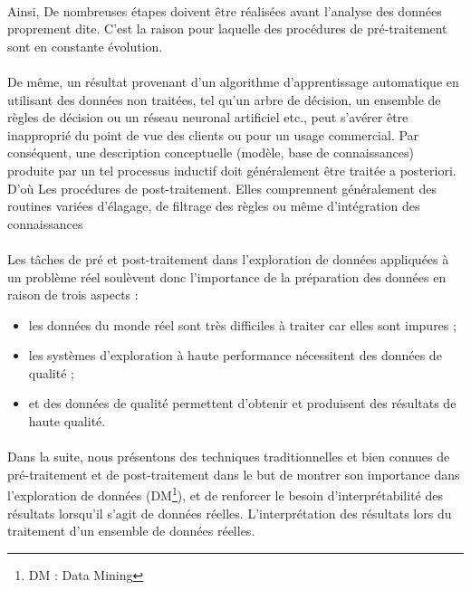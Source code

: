 \documentclass[a4paper, 12pt]{article}
\begin{document}
	\paragraph{}Ainsi, De nombreuses étapes doivent être réalisées avant l'analyse des données proprement dite. C'est la raison pour laquelle des procédures de pré-traitement sont en constante évolution.
	\paragraph{}De même, un résultat provenant d'un algorithme d'apprentissage automatique en utilisant des données non traitées, tel qu'un arbre de décision, un ensemble de règles de décision ou un réseau neuronal artificiel etc., peut s’avérer être inapproprié du point de vue des clients ou pour un usage commercial. Par conséquent, une description conceptuelle (modèle, base de connaissances) produite par  un tel processus inductif doit généralement être traitée a posteriori. D’où Les procédures de post-traitement. Elles comprennent généralement des routines variées d'élagage, de filtrage des règles ou même d'intégration des connaissances
	\paragraph{}Les tâches de pré et post-traitement dans l'exploration de données appliquées à un problème réel  soulèvent donc l'importance de la préparation des données en raison de trois aspects :
	\begin{itemize}
		\item les données du monde réel sont très difficiles à traiter car elles sont impures ; 
		\item 	les systèmes d'exploration à haute performance nécessitent des données de qualité ;
		\item et des données de qualité permettent d'obtenir et produisent des résultats de haute qualité.
	\end{itemize}
	\paragraph{}Dans la suite, nous présentons des techniques traditionnelles et bien connues de pré-traitement et de post-traitement dans le but de montrer son importance dans l'exploration de données (DM\footnote{DM : Data Mining}), et de renforcer le besoin d'interprétabilité des résultats lorsqu'il s'agit de données réelles. L’interprétation des résultats lors du traitement d'un ensemble de données réelles. 
\end{document}
